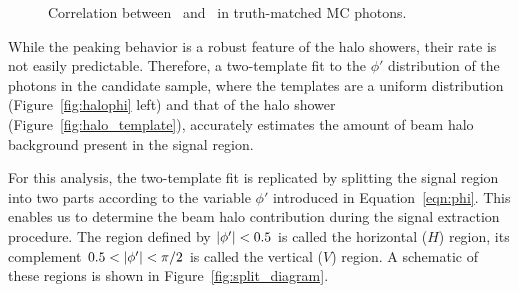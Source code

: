 \begin{figure}[htbp]
  \centering
  \caption{
    Correlation between \sieie\ and \emip\ in truth-matched MC photons. 
  }
  \label{fig:sieie_mip_corr}
\end{figure}

While the peaking behavior is a robust feature of the halo showers, their rate is not easily predictable. 
Therefore,  a two-template fit to the $\phi'$ distribution of the photons in the candidate sample, where the templates are a uniform distribution (Figure~\ref{fig:halophi} left) and that of the halo shower (Figure~\ref{fig:halo_template}), accurately estimates the amount of beam halo background present in the signal region.

For this analysis, the two-template fit is replicated by splitting the signal region into two parts according to the variable $\phi'$ introduced in Equation~\ref{eqn:phi}.
This enables us to determine the beam halo contribution during the signal extraction procedure.
The region defined by $\lvert \phi' \rvert < 0.5$ is called the horizontal ($H$) region, its complement $0.5 < \lvert \phi' \rvert < \pi/2$ is called the vertical ($V$) region.
A schematic of these regions is shown in Figure~\ref{fig:split_diagram}.


